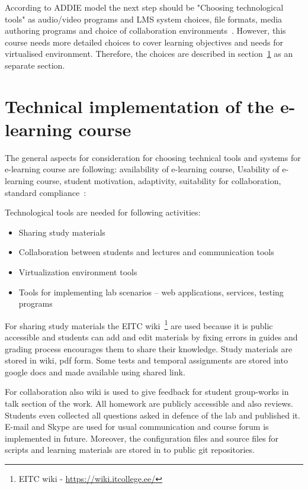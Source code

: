 According to \gls{ADDIE} model the next step should be "Choosing technological tools" as audio/video programs and \gls{LMS} system choices, file formats, media authoring programs and choice of collaboration environments~\citep{OppeArenduskeskus2010}. However, this course needs more detailed choices to cover learning objectives and needs for virtualised environment. Therefore, the choices are described in section~\ref{Technical implementation of the e-learning course} as an separate section. 

\section{Technical implementation of the e-learning course}
\label{Technical implementation of the e-learning course}

The general aspects for consideration for choosing technical tools and systems for e-learning course are following: availability of e-learning course, Usability of e-learning course, student motivation, adaptivity, suitability for collaboration, standard compliance~\citep{OppeArenduskeskus2010}:

Technological tools are needed for following activities: 
\begin{itemize}
\item Sharing study materials
\item Collaboration between students and lectures and communication tools
\item Virtualization environment tools
\item Tools for implementing lab scenarios -- web applications, services, testing programs
\end{itemize}

For sharing study materials the \gls{EITC} wiki~\footnote{\gls{EITC} wiki - \url{https://wiki.itcollege.ee/}} are used because it is public accessible and students can add and edit materials by fixing errors in guides and grading process encourages them to share their knowledge. Study materials are stored in wiki, pdf form. Some tests and temporal assignments are stored into google docs and made available using shared link.

For collaboration also wiki is used to give feedback for student group-works in talk section of the work. All homework are publicly accessible and also reviews. Students even collected all questions asked in defence of the lab and published it. E-mail and Skype are used for usual communication and course forum is implemented in future. Moreover, the configuration files and source files for scripts and learning materials are stored in to public \gls{git} repositories.

